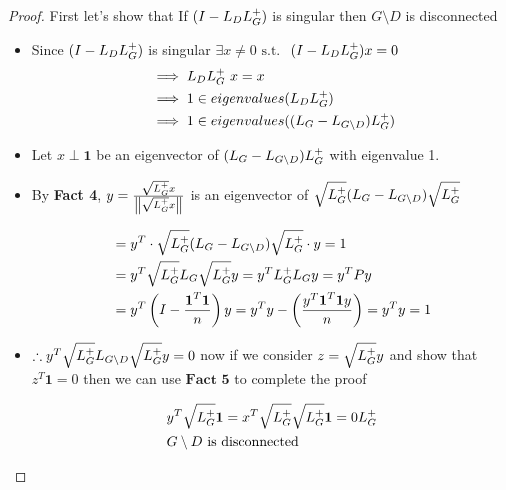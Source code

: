 \begin{proof}



 First let's show that If $(I - L_D\laplacian)$ is singular then $G \setminus D$ is disconnected 
 
 \begin{itemize}
  \item Since $(I - L_D\laplacian)$ is singular $\exists x \neq 0 \text{ s.t. }$ $(I - L_D\laplacian)x = 0$
  \begin{alignat}{1}
   & \implies L_D \laplacian \ x = x \\
   & \implies 1 \in eigenvalues(L_D\laplacian) \\
   & \implies 1 \in eigenvalues((L_G - L_{G \setminus D}) \laplacian) 
  \end{alignat}
  
  \item Let $x \perp \textbf{1}$ be an eigenvector of $(L_G - L_{G \setminus D}) \laplacian$ with eigenvalue 1.
  \item By \textbf{Fact 4}, $y = \frac{\sqrt{\laplacian} x}{\norm{\sqrt{\laplacian}x}}$ is an eigenvector of $\sqrt{\laplacian} (L_G - L_{G \setminus D}) \sqrt{\laplacian}$

\begin{alignat}{1}
   & = y^T \cdot \sqrt{\laplacian} (L_G - L_{G \setminus D}) \sqrt{\laplacian} \cdot y = 1 \\
   & = y^T \sqrt{\laplacian} L_G \sqrt{\laplacian} y = \comment{HOW} y^T \laplacian L_G y = y^T P y  \\
   & = y^T  \left( I - \frac{\textbf{1}^T \textbf{1}}{n} \right) y = y^T y - \left( \frac{y^T \textbf{1}^T \textbf{1} y}{n} \right) = \comment{(HOW)} y^T y = 1 
\end{alignat}

    \item $\therefore  y^T \sqrt{\laplacian} L_{G \setminus D} \sqrt{\laplacian} y = 0$ now if we consider $z = \sqrt{\laplacian} y$ and show that $z^T \textbf{1} = 0$ then we can use $\textbf{Fact 5}$ to complete the proof
    
    \begin{alignat}{1}
     &  y^T \sqrt{\laplacian} \textbf{1} = x^T \sqrt{\laplacian} \sqrt{\laplacian} \textbf{1} = 0 \comment{\text{(HOW is 1 in kernel of }} \laplacian \\ 
     &  G \setminus D \text{ is disconnected}
    \end{alignat}


\end{itemize}
\end{proof}
